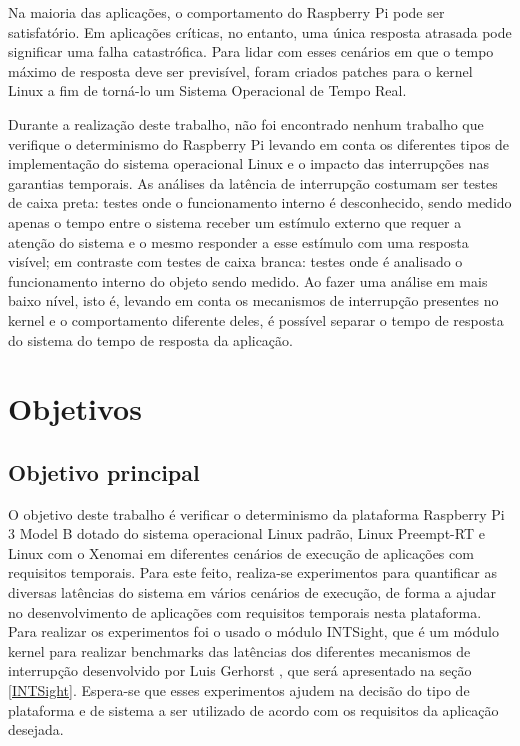 Na maioria das aplicações, o comportamento do Raspberry Pi pode ser satisfatório. Em aplicações críticas, no entanto, uma única resposta atrasada pode significar uma falha catastrófica. Para lidar com esses cenários em que o tempo máximo de resposta deve ser previsível, foram criados patches para o kernel Linux a fim de torná-lo um Sistema Operacional de Tempo Real. 

Durante a realização deste trabalho, não foi encontrado nenhum trabalho que verifique o determinismo do Raspberry Pi levando em conta os diferentes tipos de implementação do sistema operacional Linux e o impacto das interrupções nas garantias temporais. As análises da latência de interrupção costumam ser testes de caixa preta: testes onde o funcionamento interno é desconhecido, sendo medido apenas o tempo entre o sistema receber um estímulo externo que requer a atenção do sistema e o mesmo responder a esse estímulo com uma resposta visível; em contraste com testes de caixa branca: testes onde é analisado o funcionamento interno do objeto sendo medido. Ao fazer uma análise em mais baixo nível, isto é, levando em conta os mecanismos de interrupção presentes no kernel e o comportamento diferente deles, é possível separar o tempo de resposta do sistema do tempo de resposta da aplicação.

\section{Objetivos}

\subsection{Objetivo principal}

O objetivo deste trabalho é verificar o determinismo da plataforma Raspberry Pi 3 Model B dotado do sistema operacional Linux padrão, Linux Preempt-RT e Linux com o Xenomai em diferentes cenários de execução de aplicações com requisitos temporais. Para este feito, realiza-se experimentos para quantificar as diversas latências do sistema em vários cenários de execução, de forma a ajudar no desenvolvimento de aplicações com requisitos temporais nesta plataforma. Para realizar os experimentos foi o usado o módulo INTSight, que é um módulo kernel para realizar benchmarks das latências dos diferentes mecanismos de interrupção desenvolvido por Luis Gerhorst \cite{Gerhorst2018}, que será apresentado na seção \ref{INTSight}. Espera-se que esses experimentos ajudem na decisão do tipo de plataforma e de sistema a ser utilizado de acordo com os requisitos da aplicação desejada.

